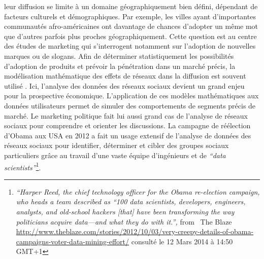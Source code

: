 leur diffusion se limite à un domaine géographiquement bien défini, dépendant de facteurs culturels et démographiques. Par exemple, les villes ayant d{\textquoteright}importantes communautés afro-américaines ont davantage de chances d{\textquoteright}adopter un m\^eme mot que d{\textquoteright}autres parfois plus proches géographiquement. Cette question est au centre des études de marketing qui s{\textquoteright}interrogent notamment sur l{\textquoteright}adoption de nouvelles marques ou de slogans. Afin de déterminer statistiquement les possibilités d{\textquoteright}adoption de produits et prévoir la pénétration dans un marché précis, la modélisation mathématique des effets de réseaux dans la diffusion est souvent utilisé \citep{Bass1994}. Ici, l{\textquoteright}analyse des données des réseaux sociaux devient un grand enjeu pour la prospective économique. L{\textquoteright}application de ces modèles mathématiques aux données utilisateurs permet de simuler des comportements de segments précis de marché. Le marketing politique fait lui aussi grand cas de l{\textquoteright}analyse de réseaux sociaux pour comprendre et orienter les discussions. La campagne de réélection d{\textquoteright}Obama aux USA en 2012 a fait un usage extensif de l{\textquoteright}analyse de données des réseaux sociaux pour identifier, déterminer et cibler des groupes sociaux particuliers gr\^ace au travail d{\textquoteright}une vaste équipe d{\textquoteright}ingénieurs et de \textit{{\textquotedblleft}data scientists{\textquotedblright}}\footnote{ \textit{{\textquotedblleft}Harper Reed, the chief technology officer for the Obama re-election campaign, who heads a team described as {\textquotedblleft}100 data scientists, developers, engineers, analysts, and old-school hackers [that] have been transforming the way politicians acquire data---and what they do with it.{\textquotedblright}, }from \ The Blaze \url{http://www.theblaze.com/stories/2012/10/03/very-creepy-details-of-obama-campaigns-voter-data-mining-effort/} consulté le 12 Mars 2014 à 14:50 GMT+1}. 

